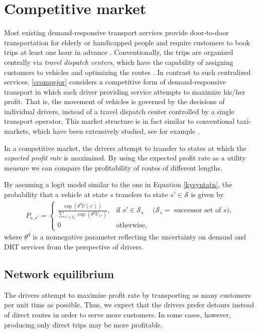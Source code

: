 \documentclass[dissertation,draft*]{aaltoseries}
\begin{document}
\section{Competitive market}
\label{compdescription}
Most existing demand-responsive transport services provide door-to-door transportation for elderly or handicapped people
and require customers to book trips at least one hour in advance \citep{cordeau05,jouko}.
Conventionally, the trips are organized centrally via \emph{travel dispatch centers}, which have the capability of
assigning customers to vehicles and optimizing the routes \citep{mageean}.
In contrast to such centralized services, \ref{ccompejor} considers a competitive form of demand-responsive transport in which 
each driver providing service attempts to maximize his/her profit. That is,
the movement of vehicles is governed by the decisions of individual drivers, 
instead of a travel dispatch center controlled by a single transport operator.
This market structure is in fact similar to conventional taxi-markets, which have been extensively studied, see for example 
\citep{hackner1995,arnott1996,cairns1996,flores-guri2003,lagos2003,wong2005,matsushima2006,fernandez2006,moore2006,yang2002,yang2005,yang2010}.

In a competitive market, the drivers attempt to transfer to
states at which the \emph{expected profit rate} is maximized. By using the expected profit rate as a 
utility measure we can compare the profitability of routes of different lengths.

By assuming a logit model similar to the one in Equation \eqref{kysyntatn},
the probability that a vehicle at state $s$ transfers to state $s' \in \mathcal{S}$
is given by
\begin{align}
\label{transitionprobability}
P_{s,s'} = 
\left\{
\begin{array}{llr}
\frac{\exp(\theta^d U(s'))}{\sum_{s'' \in \mathcal{S}_{s}} \exp(\theta^d U_{s''})}, 
& \mbox{if } s' \in \mathcal{S}_s & (\mathcal{S}_s = \mbox{ successor set of $s$)}, \\
0 & \mbox{otherwise},&
\end{array}
\right.
\end{align}
where $\theta^d$ is a 
nonnegative parameter reflecting the uncertainty on
demand and DRT services from the perspective of drivers.


\subsection{Network equilibrium}
\label{networkequilibrium}
The drivers attempt to maximize profit rate by 
transporting as many customers per unit time as possible. Thus, we expect that the
drivers prefer detours instead of direct routes in order to serve more 
customers.
In some cases, however, producing only direct trips may be more profitable. 
\end{document}
